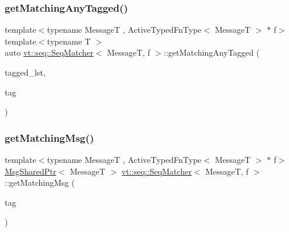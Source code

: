 \mbox{\label{structvt_1_1seq_1_1_seq_matcher_adc1e8331b331d9e289c5cb79c912ca1c}} 
\subsubsection{\texorpdfstring{get\+Matching\+Any\+Tagged()}{getMatchingAnyTagged()}}
{\footnotesize\ttfamily template$<$typename MessageT , Active\+Typed\+Fn\+Type$<$ Message\+T $>$ $\ast$ f$>$ \\
template$<$typename T $>$ \\
auto \hyperlink{structvt_1_1seq_1_1_seq_matcher}{vt\+::seq\+::\+Seq\+Matcher}$<$ MessageT, f $>$\+::get\+Matching\+Any\+Tagged (\begin{DoxyParamCaption}\item[{\hyperlink{structvt_1_1seq_1_1_seq_matcher_aeddaef880aa6f0dcc59486374d59a4cb}{Seq\+State\+Tagged\+Cont\+Type}$<$ T $>$ \&}]{tagged\+\_\+lst,  }\item[{\hyperlink{namespacevt_a84ab281dae04a52a4b243d6bf62d0e52}{Tag\+Type} const \&}]{tag }\end{DoxyParamCaption})\hspace{0.3cm}{\ttfamily [static]}}

\mbox{\label{structvt_1_1seq_1_1_seq_matcher_a457c1f447f1be51ecf3c480eca10366b}} 
\subsubsection{\texorpdfstring{get\+Matching\+Msg()}{getMatchingMsg()}}
{\footnotesize\ttfamily template$<$typename MessageT , Active\+Typed\+Fn\+Type$<$ Message\+T $>$ $\ast$ f$>$ \\
\hyperlink{namespacevt_ab2b3d506ec8e8d1540aede826d84a239}{Msg\+Shared\+Ptr}$<$ MessageT $>$ \hyperlink{structvt_1_1seq_1_1_seq_matcher}{vt\+::seq\+::\+Seq\+Matcher}$<$ MessageT, f $>$\+::get\+Matching\+Msg (\begin{DoxyParamCaption}\item[{\hyperlink{namespacevt_a84ab281dae04a52a4b243d6bf62d0e52}{Tag\+Type} const \&}]{tag }\end{DoxyParamCaption})\hspace{0.3cm}{\ttfamily [static]}}

